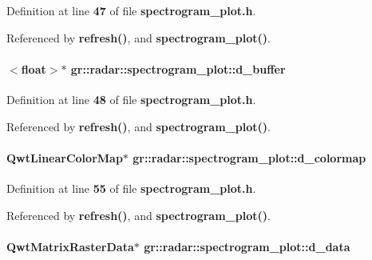 Definition at line {\bf 47} of file {\bf spectrogram\+\_\+plot.\+h}.



Referenced by {\bf refresh()}, and {\bf spectrogram\+\_\+plot()}.

\paragraph[{d\+\_\+buffer}]{$<$float$>$$\ast$ gr\+::radar\+::spectrogram\+\_\+plot\+::d\+\_\+buffer\hspace{0.3cm}{\ttfamily [private]}}\label{classgr_1_1radar_1_1spectrogram__plot_aa04c07e0815438768750178f8e7c6b77}


Definition at line {\bf 48} of file {\bf spectrogram\+\_\+plot.\+h}.



Referenced by {\bf refresh()}, and {\bf spectrogram\+\_\+plot()}.

\paragraph[{d\+\_\+colormap}]{\setlength{\rightskip}{0pt plus 5cm}Qwt\+Linear\+Color\+Map$\ast$ gr\+::radar\+::spectrogram\+\_\+plot\+::d\+\_\+colormap\hspace{0.3cm}{\ttfamily [private]}}\label{classgr_1_1radar_1_1spectrogram__plot_a79cfbd5e5bf7b7d1200306ecdbbf801e}


Definition at line {\bf 55} of file {\bf spectrogram\+\_\+plot.\+h}.



Referenced by {\bf refresh()}, and {\bf spectrogram\+\_\+plot()}.

\paragraph[{d\+\_\+data}]{\setlength{\rightskip}{0pt plus 5cm}Qwt\+Matrix\+Raster\+Data$\ast$ gr\+::radar\+::spectrogram\+\_\+plot\+::d\+\_\+data\hspace{0.3cm}{\ttfamily [private]}}\label{classgr_1_1radar_1_1spectrogram__plot_a6371849a58e536673925da46cc5756ce}


